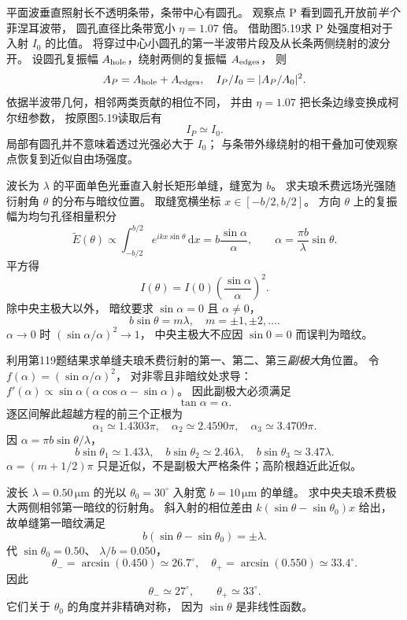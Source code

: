 平面波垂直照射长不透明条带，条带中心有圆孔。
观察点 P 看到圆孔开放前\emph{半个}菲涅耳波带，
圆孔直径比条带宽小
$\eta=1.07$ 倍。
借助图5.19求 P 处强度相对于入射 $I_0$ 的比值。
\exsolution
将穿过中心小圆孔的第一半波带片段及从长条两侧绕射的波分开。
设圆孔复振幅 $A_{\rm hole}$，绕射两侧的复振幅
$A_{\rm edges}$，
则
\[
A_P=A_{\rm hole}+A_{\rm edges},
\quad I_P/I_0=|A_P/A_0|^2.
\]
依据半波带几何，相邻两类贡献的相位不同，
并由 $\eta=1.07$ 把长条边缘变换成柯尔纽参数，
按原图5.19读取后有
\[
\boxed{I_P\simeq I_0}.
\]
\excheck 局部有圆孔并不意味着透过光强必大于 $I_0$；
与条带外缘绕射的相干叠加可使观察点恢复到近似自由场强度。

波长为 $\lambda$ 的平面单色光垂直入射长矩形单缝，缝宽为 $b$。
求夫琅禾费远场光强随衍射角 $\theta$ 的分布与暗纹位置。
\exsolution
取缝宽横坐标 $x\in[-b/2,b/2]$。
方向 $\theta$ 上的复振幅为均匀孔径相量积分
\[
\widetilde E(\theta)\propto
\int_{-b/2}^{b/2}e^{ikx\sin\theta}\,\mathrm dx
=b\frac{\sin\alpha}{\alpha},
\qquad
\alpha=\frac{\pi b}{\lambda}\sin\theta.
\]
平方得
\[
\boxed{I(\theta)=I(0)
\left(\frac{\sin\alpha}{\alpha}\right)^2}.
\]
除中央主极大以外，
暗纹要求 $\sin\alpha=0$ 且 $\alpha\ne0$，
\[
\boxed{b\sin\theta=m\lambda},
\quad m=\pm1,\pm2,\ldots .
\]
\excheck $\alpha\to0$ 时
$(\sin\alpha/\alpha)^2\to1$，
中央主极大不应因 $\sin0=0$ 而误判为暗纹。

利用第119题结果求单缝夫琅禾费衍射的第一、第二、第三\emph{副极大}角位置。
\exsolution
令
$f(\alpha)=(\sin\alpha/\alpha)^2$，
对非零且非暗纹处求导：
$f'(\alpha)\propto
\sin\alpha(\alpha\cos\alpha-\sin\alpha)$。
因此副极大必须满足
\[
\boxed{\tan\alpha=\alpha}.
\]
逐区间解此超越方程的前三个正根为
\[
\alpha_1\simeq1.4303\pi,\quad
\alpha_2\simeq2.4590\pi,\quad
\alpha_3\simeq3.4709\pi.
\]
因 $\alpha=\pi b\sin\theta/\lambda$，
\[
\boxed{b\sin\theta_1\simeq1.43\lambda},\quad
\boxed{b\sin\theta_2\simeq2.46\lambda},\quad
\boxed{b\sin\theta_3\simeq3.47\lambda}.
\]
\excheck $\alpha=(m+1/2)\pi$ 只是近似，不是副极大严格条件；高阶根趋近此近似。

波长
$\lambda=0.50\,\mathrm{\mu m}$ 的光以
$\theta_0=30^\circ$ 入射宽
$b=10\,\mathrm{\mu m}$ 的单缝。
求中央夫琅禾费极大两侧相邻第一暗纹的衍射角。
\exsolution
斜入射的相位差由
$k(\sin\theta-\sin\theta_0)x$ 给出，
故单缝第一暗纹满足
\[
\boxed{b(\sin\theta-\sin\theta_0)=\pm\lambda}.
\]
代
$\sin\theta_0=0.50$、
$\lambda/b=0.050$，
\[
\theta_-=\arcsin(0.450)\simeq26.7^\circ,\quad
\theta_+=\arcsin(0.550)\simeq33.4^\circ .
\]
因此
\[
\boxed{\theta_-\simeq27^\circ,\qquad
\theta_+\simeq33^\circ}.
\]
\excheck 它们关于 $\theta_0$ 的角度并非精确对称，
因为 $\sin\theta$ 是非线性函数。

